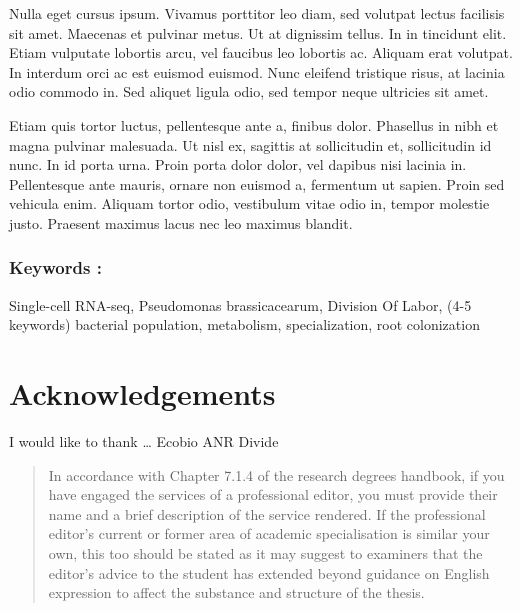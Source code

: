 \documentclass[
  11pt,
  a4paper,
]{report}
\begin{document}
Nulla eget cursus ipsum. Vivamus porttitor leo diam, sed volutpat lectus
facilisis sit amet. Maecenas et pulvinar metus. Ut at dignissim tellus.
In in tincidunt elit. Etiam vulputate lobortis arcu, vel faucibus leo
lobortis ac. Aliquam erat volutpat. In interdum orci ac est euismod
euismod. Nunc eleifend tristique risus, at lacinia odio commodo in. Sed
aliquet ligula odio, sed tempor neque ultricies sit amet.

Etiam quis tortor luctus, pellentesque ante a, finibus dolor. Phasellus
in nibh et magna pulvinar malesuada. Ut nisl ex, sagittis at
sollicitudin et, sollicitudin id nunc. In id porta urna. Proin porta
dolor dolor, vel dapibus nisi lacinia in. Pellentesque ante mauris,
ornare non euismod a, fermentum ut sapien. Proin sed vehicula enim.
Aliquam tortor odio, vestibulum vitae odio in, tempor molestie justo.
Praesent maximus lacus nec leo maximus blandit.

\subsection*{Keywords :}\label{keywords}

Single-cell RNA-seq, Pseudomonas brassicacearum, Division Of Labor, (4-5
keywords) bacterial population, metabolism, specialization, root
colonization


\chapter*{Acknowledgements}\label{acknowledgements}


I would like to thank \ldots{} Ecobio ANR Divide

\begin{quote}
In accordance with Chapter 7.1.4 of the research degrees handbook, if
you have engaged the services of a professional editor, you must provide
their name and a brief description of the service rendered. If the
professional editor's current or former area of academic specialisation
is similar your own, this too should be stated as it may suggest to
examiners that the editor's advice to the student has extended beyond
guidance on English expression to affect the substance and structure of
the thesis.
\end{quote}
\end{document}
